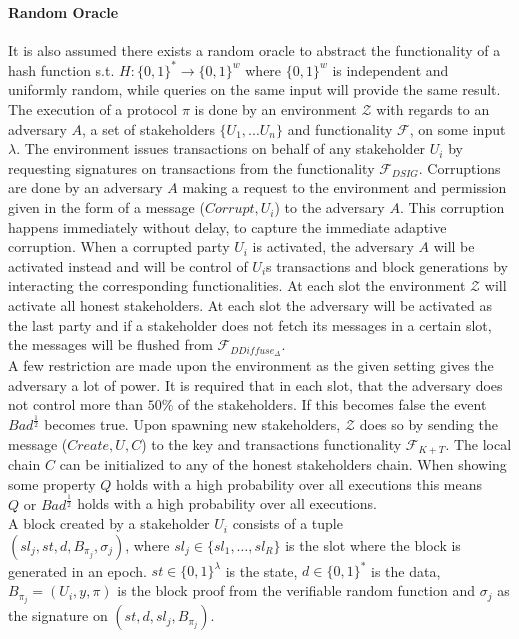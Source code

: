 \paragraph{Random Oracle} It is also assumed there exists a random oracle to abstract the functionality of a hash function s.t. $H: \{0,1\}^* \xrightarrow{} \{0,1\}^w$ where $\{0,1\}^w$ is independent and uniformly random, while queries on the same input will provide the same result.\\


The execution of a protocol $\pi$ is done by an environment $\mathcal{Z}$ with regards to an adversary $A$, a set of stakeholders $\{U_1,... U_n\}$ and functionality $\mathcal{F}$, on some input $\lambda$. The environment issues transactions on behalf of any stakeholder $U_i$ by requesting signatures on transactions from the functionality $\mathcal{F}_{DSIG}$. Corruptions are done by an adversary $A$ making a request to the environment and permission given in the form of a message ($Corrupt, U_i$) to the adversary $A$. This corruption happens immediately without delay, to capture the immediate adaptive corruption. When a corrupted party $U_i$ is activated, the adversary $A$ will be activated instead and will be control of $U_i$s transactions and block generations by interacting the corresponding functionalities. At each slot the environment $\mathcal{Z}$ will activate all honest stakeholders. At each slot the adversary will be activated as the last party and if a stakeholder does not fetch its messages in a certain slot, the messages will be flushed from $\mathcal{F}_{DDiffuse_{\Delta}}$.\\

A few restriction are made upon the environment as the given setting gives the adversary a lot of power. It is required that in each slot, that the adversary does not control more than $50\%$ of the stakeholders. If this becomes false the event $Bad^{\frac{1}{2}}$ becomes true. Upon spawning new stakeholders, $\mathcal{Z}$ does so by sending the message ($Create, U, C$) to the key and transactions functionality $\mathcal{F}_{K+T}$. The local chain $C$ can be initialized to any of the honest stakeholders chain. When showing some property $Q$ holds with a high probability over all executions this means $Q \text{ or } Bad^{\frac{1}{2}}$ holds with a high probability over all executions. \\

A block created by a stakeholder $U_i$ consists of a tuple \\ $(sl_j, st, d, B_{\pi_j}, \sigma_j)$, where $sl_j \in \{sl_1, \dots, sl_R\}$ is the slot where the block is generated in an epoch. $st \in \{0,1\}^{\lambda}$ is the state, $d \in \{0,1\}^*$ is the data, $B_{\pi_j} = (U_i, y, \pi)$ is the block proof from the verifiable random function and $\sigma_j$ as the signature on $(st,d,sl_j, B_{\pi_j})$. \\

